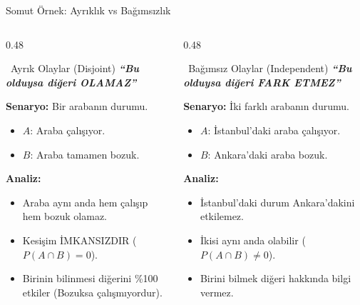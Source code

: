 \documentclass[light]{lutbeamer}
\begin{document}
\begin{frame}{Somut Örnek: Ayrıklık vs Bağımsızlık}
    \begin{columns}[T]
        \begin{column}{0.48\textwidth}
            \begin{block}{\faLink\ Ayrık Olaylar (Disjoint)}
                \textbf{\textit{``Bu olduysa diğeri OLAMAZ''}}
                \vspace{0.2cm}
                
                \textbf{Senaryo:} Bir arabanın durumu.
                \begin{itemize}
                    \item \(A\): Araba çalışıyor.
                    \item \(B\): Araba tamamen bozuk.
                \end{itemize}
                
                \textbf{Analiz:}
                \begin{itemize}
                    \item Araba aynı anda hem çalışıp hem bozuk olamaz.
                    \item Kesişim İMKANSIZDIR ($P(A\cap B)=0$).
                    \item Birinin bilinmesi diğerini \%100 etkiler (Bozuksa çalışmıyordur).
                \end{itemize}
            \end{block}
        \end{column}
        \begin{column}{0.48\textwidth}
            \begin{block}{\faUnlink\ Bağımsız Olaylar (Independent)}
                \textbf{\textit{``Bu olduysa diğeri FARK ETMEZ''}}
                \vspace{0.2cm}
                
                \textbf{Senaryo:} İki farklı arabanın durumu.
                \begin{itemize}
                    \item \(A\): İstanbul'daki araba çalışıyor.
                    \item \(B\): Ankara'daki araba bozuk.
                \end{itemize}
                
                \textbf{Analiz:}
                \begin{itemize}
                    \item İstanbul'daki durum Ankara'dakini etkilemez.
                    \item İkisi aynı anda olabilir ($P(A\cap B) \neq 0$).
                    \item Birini bilmek diğeri hakkında bilgi vermez.
                \end{itemize}
            \end{block}       
        \end{column}
    \end{columns}
\end{frame}
\end{document}
